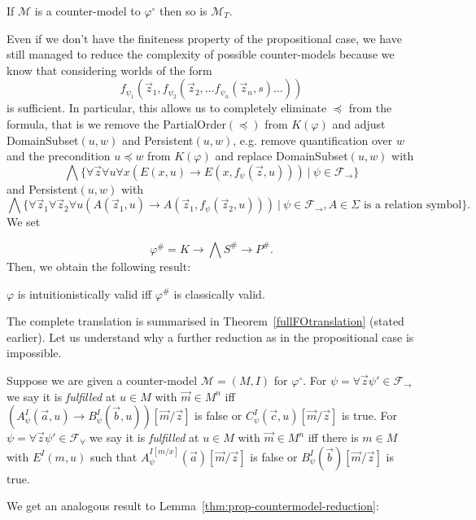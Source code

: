 \documentclass[a4paper,UKenglish,cleveref, autoref, thm-restate]{lipics-v2021}
\begin{document}
\begin{lemma}
	If $\mathcal M$ is a counter-model to $\varphi^\circ$ then so is $\mathcal M_T$.
\end{lemma}

Even if we don't have the finiteness property of the propositional case, we have still managed to reduce the complexity of possible counter-models because we know that considering worlds of the form $$f_{\psi_1}(\vec z_1, f_{\psi_2}(\vec z_2, \dots f_{\psi_n}(\vec z_n, s)\dots))$$ is sufficient.
In particular, this allows us to completely eliminate $\preceq$ from the formula, that is we remove the PartialOrder$(\preceq)$
from $K(\varphi)$ and adjust DomainSubset$(u, w)$ and Persistent$(u, w)$, e.g. remove quantification over $w$ and the precondition $u\preceq w$ from $K(\varphi)$ and replace DomainSubset$(u, w)$ with
$$\bigwedge\{\forall \vec z\forall u\forall x(E(x, u)\to E(x, f_\psi(\vec z, u)))\:|\:\psi\in\mathcal F_\to\}$$ and Persistent$(u, w)$ with $$\bigwedge\{\forall\vec z_1\forall\vec z_2\forall u(A(\vec z_1, u)\to A(\vec z_1, f_\psi(\vec z_2, u)))\:|\:\psi\in\mathcal F_\to, \text{$A\in\Sigma$ is a relation symbol}\}.$$ We set

$$\varphi^{\#} = K\to \bigwedge S^\#\to P^\#.$$
Then, we obtain the following result:
\begin{theorem}
	\label{thm:fo-reduction}
	$\varphi$ is intuitionistically valid iff $\varphi^\#$ is classically valid.
\end{theorem}
The complete translation is summarised in Theorem~\ref{fullFOtranslation} (stated earlier). Let us understand why a further reduction as in the propositional case is impossible.


\begin{definition}
\label{def:fo-fulfilled}
	Suppose we are given a counter-model $\mathcal M = (M, I)$ for $\varphi^\circ$. For $\psi = \forall\vec z\psi'\in\mathcal F_\to$ we say it is \emph{fulfilled} at $u\in M$ with $\vec m\in M^n$ iff $(A_\psi^I(\vec a, u)\to B_\psi^I(\vec b, u))[\vec m/\vec z]$ is false or $C_\psi^I(\vec c, u)[\vec m/\vec z]$ is true.
	For $\psi = \forall\vec z\psi'\in\mathcal F_\forall$ we say it is \emph{fulfilled} at $u\in M$ with $\vec m\in M^n$ iff there is $m\in M$ with $E^{I}(m, u)$ such that $A^{I[m/x]}_\psi(\vec a)[\vec m/\vec z]$ is false or $B_\psi^I(\vec b)[\vec m/\vec z]$ is true.
\end{definition}

We get an analogous result to Lemma~\ref{thm:prop-countermodel-reduction}:
\end{document}
